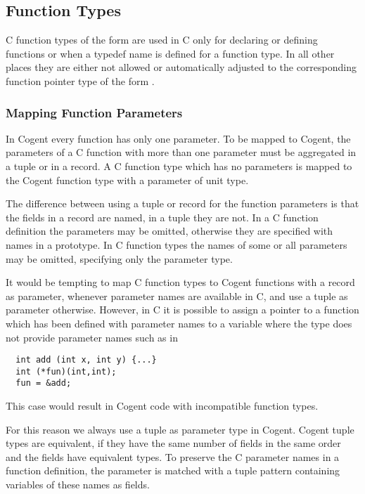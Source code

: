 \subsection{Function Types}
\label{design-types-function}

C function types of the form  are used in C only for declaring or defining functions or
when a typedef name is defined for a function type. In all other
places they are either not allowed or automatically adjusted to the corresponding function pointer type
of the form . 

\subsubsection{Mapping Function Parameters}

In Cogent every function
has only one parameter. To be mapped to Cogent, the parameters of a C function with more than one parameter must
be aggregated in a tuple or in a record. A C function type  which has no parameters is mapped
to the Cogent function type  with a parameter of unit type.

The difference between using a tuple or record for the function parameters is that the fields in a 
record are named, in a tuple they are not. In 
a C function definition the parameters may be omitted, otherwise they are specified with names in a prototype.
In C function types the names of some or all parameters may be omitted, specifying only the parameter type.

It would be tempting to map C function types to Cogent functions with a record as parameter, whenever parameter 
names are available in C, and use a tuple as parameter otherwise. However, in C it is possible to assign a 
pointer to a function which has been defined 
with parameter names to a variable where the type does not provide parameter names such as in 
\begin{verbatim}
  int add (int x, int y) {...}
  int (*fun)(int,int);
  fun = &add;
\end{verbatim}
This case would result in Cogent code with incompatible function types.

For this reason we always use a tuple as parameter type in Cogent. Cogent tuple types are equivalent, if they
have the same number of fields in the same order and the fields have equivalent types. To preserve the C parameter names in 
a function definition, the parameter is matched with a tuple pattern containing variables of these
names as fields.

